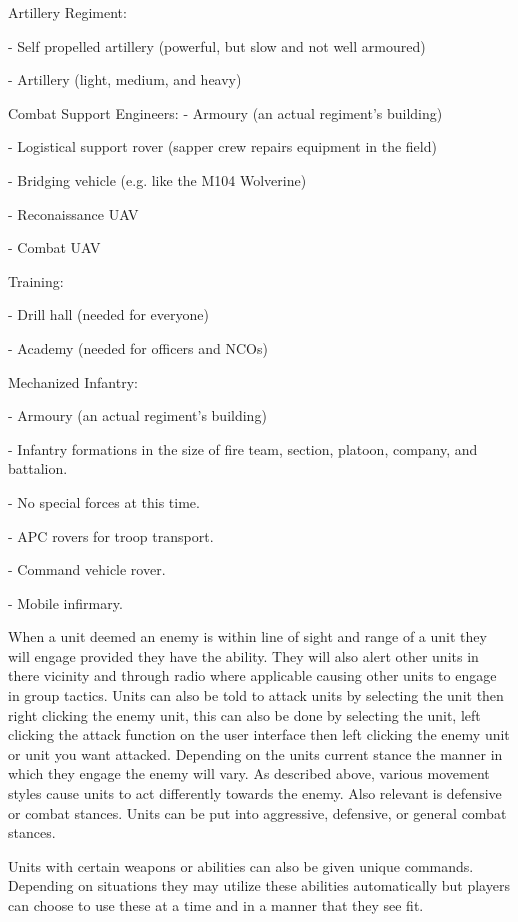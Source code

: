 Artillery Regiment:

- Self propelled artillery (powerful, but slow and not well armoured)

- Artillery (light, medium, and heavy)

Combat Support Engineers:
- Armoury (an actual regiment's building)

- Logistical support rover (sapper crew repairs equipment in the field)

- Bridging vehicle (e.g. like the M104 Wolverine)

- Reconaissance UAV

- Combat UAV

Training:

- Drill hall (needed for everyone)

- Academy (needed for officers and NCOs)

Mechanized Infantry:

- Armoury (an actual regiment's building)

- Infantry formations in the size of fire team, section, platoon,
company, and battalion.

- No special forces at this time.

- APC rovers for troop transport.

- Command vehicle rover.

- Mobile infirmary.


When a unit deemed an enemy is within line of sight and range of a unit they will engage provided they have the ability. They will also alert other units in there vicinity and through radio where applicable causing other units to engage in group tactics. Units can also be told to attack units by selecting the unit then right clicking the enemy unit, this can also be done by selecting the unit, left clicking the attack function on the user interface then left clicking the enemy unit or unit you want attacked. Depending on the units current stance the manner in which they engage the enemy will vary. As described above, various movement styles cause units to act differently towards the enemy. Also relevant is defensive or combat stances. Units can be put into aggressive, defensive, or general combat stances.

Units with certain weapons or abilities can also be given unique commands. Depending on situations they may utilize these abilities automatically but players can choose to use these at a time and in a manner that they see fit. 

